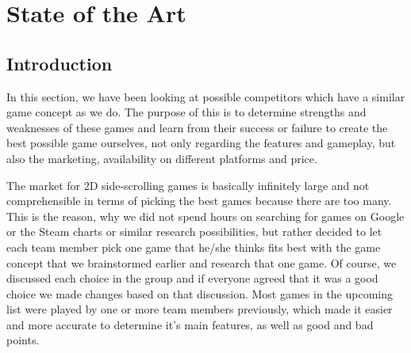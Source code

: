 \documentclass[12p]{article}
\begin{document}
\newpage
\section{State of the Art} \label{sec:StateOfTheArt}
\subsection{Introduction}




In this section, we have been looking at possible competitors which have a similar game concept as we do. The purpose of this is to determine strengths and weaknesses of these games and learn from their success or failure to create the best possible game ourselves, not only regarding the features and gameplay, but also the marketing, availability on different platforms and price.

The market for 2D side-scrolling games is basically infinitely large and not comprehensible in terms of picking the best games because there are too many. This is the reason, why we did not spend hours on searching for games on Google or the Steam charts or similar research possibilities, but rather decided to let each team member pick one game that he/she thinks fits best with the game concept that we brainstormed earlier and research that one game. Of course, we discussed each choice in the group and if everyone agreed that it was a good choice we made changes based on that discussion. Most games in the upcoming list were played by one or more team members previously, which made it easier and more accurate to determine it's main features, as well as good and bad points.
\end{document}
